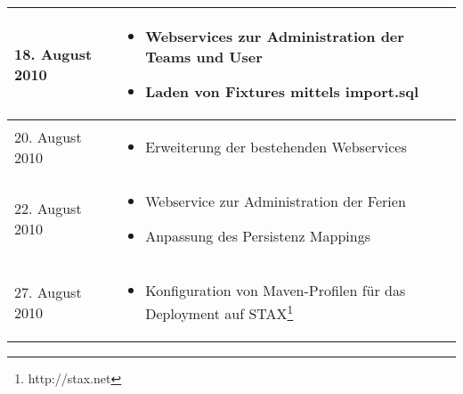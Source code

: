 \begin{spacing}{0.5}
\begin{longtable}{|p{4cm}|p{10cm}|}
  18. August 2010 & 
  \begin{itemize}
  \item Webservices zur Administration der Teams und User
  \item Laden von Fixtures mittels import.sql
  \end{itemize}\\
  \hline
  
    20. August 2010 & 
  \begin{itemize}
  \item Erweiterung der bestehenden Webservices
  \end{itemize}\\
  \hline
  
   22. August 2010 & 	
  \begin{itemize}
  \item Webservice zur Administration der Ferien
  \item Anpassung des Persistenz Mappings
  \end{itemize}\\
  \hline
   27. August 2010 & 
  \begin{itemize}
  \item Konfiguration von Maven-Profilen f\"ur das Deployment auf STAX\footnote{http://stax.net}
  \end{itemize}\\
  \hline
  
  
    \end{longtable}
\end{spacing}
  
